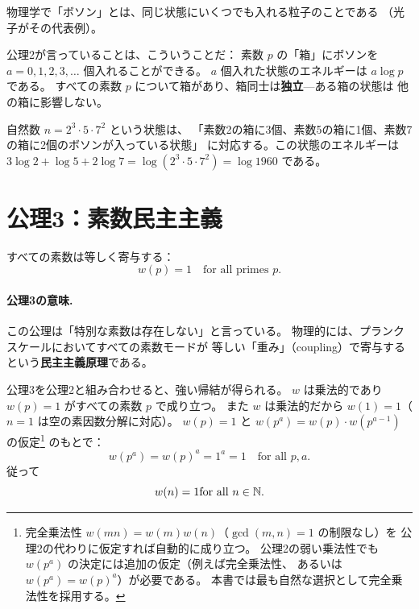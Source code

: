 \begin{hsbox}
物理学で「ボソン」とは、同じ状態にいくつでも入れる粒子のことである
（光子がその代表例）。

公理2が言っていることは、こういうことだ：
素数 $p$ の「箱」にボソンを $a = 0, 1, 2, 3, \ldots$ 個入れることができる。
$a$ 個入れた状態のエネルギーは $a \log p$ である。
すべての素数 $p$ について箱があり、箱同士は\textbf{独立}---ある箱の状態は
他の箱に影響しない。

自然数 $n = 2^3 \cdot 5 \cdot 7^2$ という状態は、
「素数2の箱に3個、素数5の箱に1個、素数7の箱に2個のボソンが入っている状態」
に対応する。この状態のエネルギーは
$3\log 2 + \log 5 + 2\log 7 = \log(2^3 \cdot 5 \cdot 7^2) = \log 1960$ である。
\end{hsbox}


\section{公理3：素数民主主義}
\label{sec:axiom3}

\begin{dfnbox}[公理3（素数民主主義）]
すべての素数は等しく寄与する：
\begin{equation}
  w(p) = 1 \quad \text{for all primes } p.
  \label{eq:democracy}
\end{equation}
\end{dfnbox}

\paragraph{公理3の意味.}
この公理は「特別な素数は存在しない」と言っている。
物理的には、プランクスケールにおいてすべての素数モードが
等しい「重み」（coupling）で寄与するという\textbf{民主主義原理}である。

公理3を公理2と組み合わせると、強い帰結が得られる。
$w$ は乗法的であり $w(p) = 1$ がすべての素数 $p$ で成り立つ。
また $w$ は乗法的だから $w(1) = 1$（$n = 1$ は空の素因数分解に対応）。
$w(p) = 1$ と $w(p^a) = w(p) \cdot w(p^{a-1})$ の仮定\footnote{%
完全乗法性 $w(mn) = w(m)w(n)$（$\gcd(m,n) = 1$ の制限なし）を
公理2の代わりに仮定すれば自動的に成り立つ。
公理2の弱い乗法性でも $w(p^a)$ の決定には追加の仮定（例えば完全乗法性、
あるいは $w(p^a) = w(p)^a$）が必要である。
本書では最も自然な選択として完全乗法性を採用する。}
のもとで：
\begin{equation}
  w(p^a) = w(p)^a = 1^a = 1 \quad \text{for all } p, a.
\end{equation}
従って
\begin{equation}
  w(n) = 1  \text{for all } n \in \mathbb{N}.
\end{equation}

